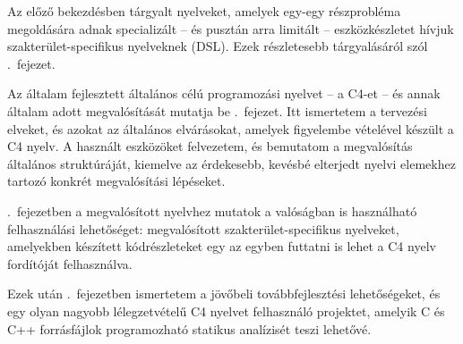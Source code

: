 Az előző bekezdésben tárgyalt nyelveket, amelyek egy-egy részprobléma megoldására adnak specializált -- és pusztán arra limitált -- eszközkészletet hívjuk szakterület-specifikus nyelveknek (\gls{DSL}).
Ezek részletesebb tárgyalásáról szól .~fejezet.

Az általam fejlesztett általános célú programozási nyelvet -- a C4-et -- és annak általam adott megvalósítását mutatja be .~fejezet.
Itt ismertetem a tervezési elveket, és azokat az általános elvárásokat, amelyek figyelembe vételével készült a C4 nyelv.
A használt eszközöket felvezetem, és bemutatom a megvalósítás általános struktúráját, kiemelve az érdekesebb, kevésbé elterjedt nyelvi elemekhez tartozó konkrét megvalósítási lépéseket.

.~fejezetben a megvalósított nyelvhez mutatok a valóságban is használható felhasználási lehetőséget: megvalósított szakterület-specifikus nyelveket, amelyekben készített kódrészleteket egy az egyben futtatni is lehet a C4 nyelv fordítóját felhasználva.

Ezek után .~fejezetben ismertetem a jövőbeli továbbfejlesztési lehetőségeket, és egy olyan nagyobb lélegzetvételű C4 nyelvet felhasználó projektet, amelyik C és C++ forrásfájlok programozható statikus analízisét teszi lehetővé.


















